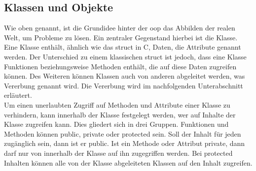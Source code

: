 \subsection{Klassen und Objekte}
Wie oben genannt, ist die Grundidee hinter der \acs{oop} das Abbilden der realen Welt, um Probleme zu lösen. Ein zentraler Gegenstand hierbei ist die Klasse. Eine Klasse enthält, ähnlich wie das \glqq struct\grqq{} in C, Daten, die Attribute genannt werden. Der Unterschied zu einem klassischen  \glqq struct\grqq{} ist jedoch, dass eine Klasse Funktionen beziehungsweise Methoden enthält, die auf diese Daten zugreifen können. Des Weiteren können  Klassen auch von anderen abgeleitet werden, was Vererbung genannt wird. Die Vererbung wird im nachfolgenden Unterabschnitt erläutert. \\
Um einen unerlaubten Zugriff auf Methoden und Attribute einer Klasse zu verhindern, kann innerhalb der Klasse festgelegt werden, wer auf Inhalte der Klasse zugreifen kann. Dies gliedert sich in drei Gruppen. Funktionen und Methoden können \glqq public\grqq{},  \glqq private\grqq{} oder \glqq protected\grqq{} sein. Soll der Inhalt für jeden zugänglich sein, dann ist er \glqq public\grqq{}. Ist ein Methode oder Attribut \glqq private\grqq{}, dann darf nur von innerhalb der Klasse auf ihn zugegriffen werden. Bei \glqq protected\grqq{} Inhalten können alle von der Klasse abgeleiteten Klassen auf den Inhalt zugreifen.

